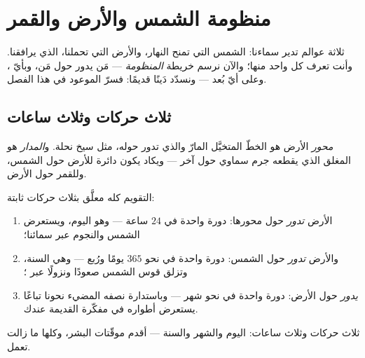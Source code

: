 \chapter{منظومة الشمس والأرض والقمر}\label{ch:g6:sun-earth-moon}

ثلاثة عوالم تدير سماءنا: الشمس التي تمنح النهار، والأرض التي
تحملنا،  الذي يرافقنا. وأنت تعرف كل واحد منها؛ والآن نرسم
خريطة \emph{المنظومة} --- مَن يدور حول مَن، وبأيّ ، وعلى أيّ
بُعد --- ونسدّد دَينًا قديمًا: فسرّ  الموعود في هذا
الفصل.

\section{ثلاث حركات وثلاث ساعات}

\begin{definition}\label{def:g6:sun-earth-moon:axisorbit}
\emph{محور} الأرض هو الخطّ المتخيَّل المارّ 
والذي تدور حوله، مثل سيخ نحلة. و\emph{المدار} هو
 المغلق الذي يقطعه جرم سماوي حول آخر --- ويكاد يكون دائرة
للأرض حول الشمس، وللقمر حول الأرض.
\end{definition}

\begin{proposition}\label{prop:g6:sun-earth-moon:motions}
التقويم كله معلَّق بثلاث حركات ثابتة:
\begin{enumerate}
  \item الأرض \emph{تدور} حول محورها: دورة واحدة في $24$
        ساعة --- وهو اليوم، ويستعرض الشمس والنجوم عبر سمائنا؛
  \item والأرض \emph{تدور} حول الشمس: دورة واحدة في نحو $365$
        يومًا ورُبع --- وهي السنة، وتزلق قوس الشمس صعودًا ونزولًا
        عبر ؛
  \item {} \emph{يدور} حول الأرض: دورة واحدة في نحو شهر ---
        وباستدارة نصفه المضيء نحونا تباعًا يستعرض أطواره في
        مفكّرة  القديمة عندك.
\end{enumerate}
ثلاث حركات وثلاث ساعات: اليوم والشهر والسنة --- أقدم موقّتات
البشر، وكلها ما زالت تعمل.
\end{proposition}

